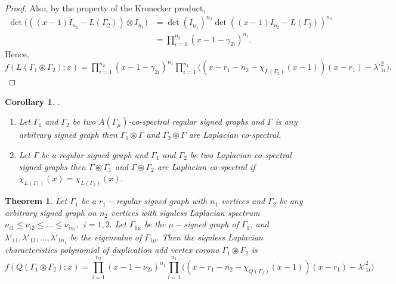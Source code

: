\documentclass[12pt,a4paper]{article}
\newtheorem{theorem}{Theorem}[section]
\newtheorem{corollary}{Corollary}[theorem]
\theoremstyle{definition}
\theoremstyle{remark}
\begin{document}
\begin{proof}
        Also, by the property of the Kronecker product,
        \begin{equation*}
            \begin{split}
                \det\big(((x-1)I_{n_2}-L(\Gamma_2))\otimes I_{n_1}\big)&=\det(I_{n_1})^{n_2}\det((x-1)I_{n_2}-L(\Gamma_2))^{n_1}\\
                &=\prod_{i=1}^{n_2}(x-1-\gamma_{2i})^{n_1}.
            \end{split}
        \end{equation*}
        Hence, $f(L(\Gamma_1\circledast\Gamma_2);x)=\prod_{i=1}^{n_2}(x-1-\gamma_{2i})^{n_1} \prod_{i=1}^{n_1}\big((x-r_1-n_2-\chi_{L(\Gamma_2)}(x-1))(x-r_1)-{\lambda'}_{1i}^2\big).$
    \end{proof}

    \begin{corollary}.\\ \vspace{-20pt}
         \begin{enumerate}
            \item Let $\Gamma_1$ and $\Gamma_2$ be two $A(\Gamma_{\mu})$-co-spectral regular signed graphs and $\Gamma$ is any arbitrary signed graph then $\Gamma_1\circledast\Gamma$ and $\Gamma_2\circledast\Gamma$ are Laplacian co-spectral.
            \item Let $\Gamma$ be a regular signed graph and $\Gamma_1$ and $\Gamma_2$ be two Laplacian co-spectral signed graphs then $\Gamma\circledast\Gamma_1$ and $\Gamma\circledast\Gamma_2$ are Laplacian co-spectral if $\chi_{L(\Gamma_1)}(x)=\chi_{L(\Gamma_2)}(x).$
        \end{enumerate}
    \end{corollary}

    \begin{theorem}
         Let $\Gamma_1$ be a $r_1-$regular signed graph with $n_1$ vertices and $\Gamma_2$ be any arbitrary signed graph on $n_2$ vertices with signless Laplacian spectrum $\nu_{i1}\leq\nu_{i2}\leq\ldots\leq\nu_{in_i},~~i=1,2.$ Let $\Gamma_{1\mu}$ be the $\mu-$signed graph of $\Gamma_1$, and $\lambda'_{11},\lambda'_{12},\ldots,\lambda'_{1n_1}$ be the eigenvalue of $\Gamma_{1\mu}.$ Then the signless Laplacian characteristics polynomial of duplication add vertex corona $\Gamma_1\circledast\Gamma_2$ is $$f(Q(\Gamma_1\circledast\Gamma_2);x)=\prod_{i=1}^{n_2}(x-1-\nu_{2i})^{n_1} \prod_{i=1}^{n_1}\big((x-r_1-n_2-\chi_{Q(\Gamma_2)}(x-1))(x-r_1)-{\lambda'}_{1i}^2\big)$$
    \end{theorem}
\end{document}

